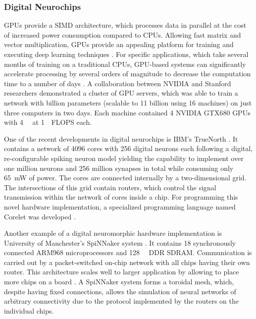 \subsubsection{Digital Neurochips}

\acp{GPU} provide a \ac{SIMD} architecture, which processes data in parallel at the cost of increased power consumption \parencite{Krichmar2011, Carlson2014} compared to \acp{CPU}.
Allowing fast matrix and vector multiplication, \acp{GPU} provide an appealing platform for training and executing deep learning techniques \parencite{Schmidhuber2015}.
For specific applications, which take several months of training on a traditional \acp{CPU}, \ac{GPU}-based systems can significantly accelerate processing by several orders of magnitude to decrease the computation time to a number of days \parencite{Edwards2015}.
A collaboration between NVIDIA and Stanford researchers demonstrated a cluster of \ac{GPU} servers, which was able to train a network with billion parameters (scalable to \num{11} billion using \num{16} machines) on just three computers in two days.
Each machine contained \num{4} NVIDIA GTX680 \acp{GPU} with \SI{4}{\giga\byte} at \SI{1}{\tera\nothing}\ac{FLOPS} each.

One of the recent developments in digital neurochips is IBM's TrueNorth \parencite{Akopyan2015}.
It contains a network of \num{4096} cores with \num{256} digital neurons each following a digital, re-configurable spiking neuron model \parencite{Cassidy2013} yielding the capability to implement over one million neurons and \num{256} million synapses in total while consuming only \SI{65}{\milli\watt} of power.
The cores are connected internally by a two-dimensional grid.
The intersections of this grid contain routers, which control the signal transmission within the network of cores inside a chip.
For programming this novel hardware implementation, a specialized programming language named Corelet was developed \parencite{Amir2013}.

Another example of a digital neuromorphic hardware implementation is University of Manchester's \ac{SpiNNaker} system \parencite{Furber2014}.
It contains \num{18} synchronously connected ARM968 microprocessors and \SI{128}{\mega\byte} \ac{DDR} \ac{SDRAM}.
Communication is carried out by a packet-switched on-chip network with all chips having their own router.
This architecture scales well to larger application by allowing to place more chips on a board \parencite{Painkras2013,Navaridas2009}.
A \ac{SpiNNaker} system forms a toroidal mesh, which, despite having fixed connections, allows the simulation of neural networks of arbitrary connectivity due to the protocol implemented by the routers on the individual chips.

